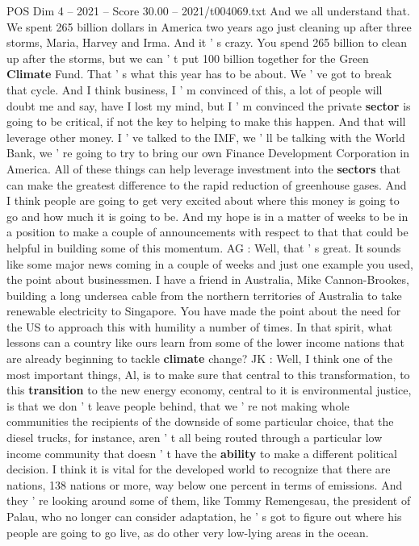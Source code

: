 \begin{textsample}{POS Dim 4 – 2021 – Score 30.00 – 2021/t004069.txt}
And we all understand that.
We spent 265 billion dollars in America two years ago just cleaning up after three storms, Maria, Harvey and Irma.
And it ' s crazy.
You spend 265 billion to clean up after the storms, but we can ' t put 100 billion together for the Green \textbf{Climate} Fund.
That ' s what this year has to be about.
We ' ve got to break that cycle.
And I think business, I ' m convinced of this, a lot of people will doubt me and say, have I lost my mind, but I ' m convinced the private \textbf{sector} is going to be critical, if not the key to helping to make this happen.
And that will leverage other money.
I ' ve talked to the IMF, we ' ll be talking with the World Bank, we ' re going to try to bring our own Finance Development Corporation in America.
All of these things can help leverage investment into the \textbf{sectors} that can make the greatest difference to the rapid reduction of greenhouse gases.
And I think people are going to get very excited about where this money is going to go and how much it is going to be.
And my hope is in a matter of weeks to be in a position to make a couple of announcements with respect to that that could be helpful in building some of this momentum.
AG : Well, that ' s great.
It sounds like some major news coming in a couple of weeks and just one example you used, the point about businessmen.
I have a friend in Australia, Mike Cannon-Brookes, building a long undersea cable from the northern territories of Australia to take renewable electricity to Singapore.
You have made the point about the need for the US to approach this with humility a number of times.
In that spirit, what lessons can a country like ours learn from some of the lower income nations that are already beginning to tackle \textbf{climate} change?
JK : Well, I think one of the most important things, Al, is to make sure that central to this transformation, to this \textbf{transition} to the new energy economy, central to it is environmental justice, is that we don ' t leave people behind, that we ' re not making whole communities the recipients of the downside of some particular choice, that the diesel trucks, for instance, aren ' t all being routed through a particular low income community that doesn ' t have the \textbf{ability} to make a different political decision.
I think it is vital for the developed world to recognize that there are nations, 138 nations or more, way below one percent in terms of emissions.
And they ' re looking around some of them, like Tommy Remengesau, the president of Palau, who no longer can consider adaptation, he ' s got to figure out where his people are going to go live, as do other very low-lying areas in the ocean.

\end{textsample}
